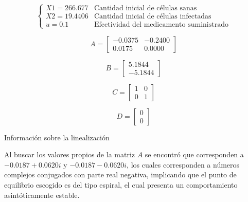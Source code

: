 \documentclass{article}
\begin{document}
\begin{table}[H]
\begin{equation*}
    \begin{cases}
       X1 = 266.677 & \text{Cantidad inicial de células sanas} \\
       X2 = 19.4406 & \text{Cantidad inicial de células infectadas}\\
       u = 0.1      & \text{Efectividad del medicamento suministrado}
    \end{cases}
\end{equation*}

\begin{multicols}{4}
    \begin{equation*}
        A = \begin{bmatrix}
                -0.0375 & -0.2400\\[0.25cm]
                0.0175 & 0.0000
            \end{bmatrix}
    \end{equation*}

    \begin{equation*}
        B = \begin{bmatrix}
                5.1844\\[0.25cm]
                -5.1844
            \end{bmatrix}
    \end{equation*}

    \begin{equation*}
        C = \begin{bmatrix}
                1 & 0\\[0.25cm]
                0 & 1
            \end{bmatrix}
    \end{equation*}

    \begin{equation*}
        D = \begin{bmatrix}
                0\\[0.25cm]
                0
            \end{bmatrix}
    \end{equation*}

\end{multicols}
\caption{Información sobre la linealización}
\label{table:linearInfo}
\end{table}

Al buscar los valores propios de la matriz $A$ se encontró que corresponden a
$-0.0187 + 0.0620i$ y $-0.0187 - 0.0620i$, los cuales corresponden a números
complejos conjugados con parte real negativa, implicando que el punto de equilibrio
escogido es del tipo espiral, el cual presenta un comportamiento asintóticamente
estable.
\end{document}
